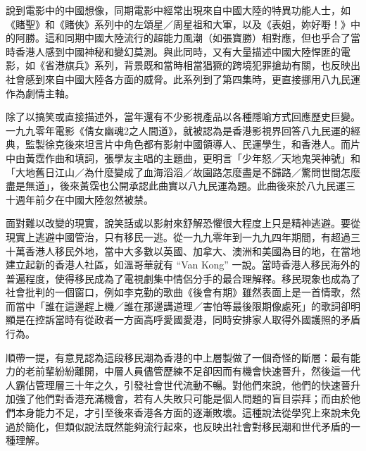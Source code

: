 說到電影中的中國想像，同期電影中經常出現來自中國大陸的特異功能人士，如《賭聖》和《賭俠》系列中的左頌星／周星祖和大軍，以及《表姐，妳好嘢！》中的阿勝。這和同期中國大陸流行的超能力風潮（如張寶勝）相對應，但也乎合了當時香港人感到中國神秘和變幻莫測。與此同時，又有大量描述中國大陸悍匪的電影，如《省港旗兵》系列，背景既和當時相當猖獗的跨境犯罪搶劫有關，也反映出社會感到來自中國大陸各方面的威脅。此系列到了第四集時，更直接挪用八九民運作為劇情主軸。

除了以搞笑或直接描述外，當年還有不少影視產品以各種隱喻方式回應歷史巨變。一九九零年電影《倩女幽魂2之人間道》，就被認為是香港影視界回答八九民運的經典，監製徐克後來坦言片中角色都有影射中國領導人、民運學生，和香港人。而片中由黃霑作曲和填詞，張學友主唱的主題曲，更明言「少年怒／天地鬼哭神號」和「大地舊日江山／為什麼變成了血海滔滔／故園路怎麼盡是不歸路／驚問世間怎麼盡是無道」，後來黃霑也公開承認此曲實以八九民運為題。此曲後來於八九民運三十週年前夕在中國大陸忽然被禁。

面對難以改變的現實，說笑話或以影射來舒解恐懼很大程度上只是精神逃避。要從現實上逃避中國管治，只有移民一逃。從一九九零年到一九九四年期間，有超過三十萬香港人移民外地，當中大多數以英國、加拿大、澳洲和美國為目的地，在當地建立起新的香港人社區，如溫哥華就有 “Van Kong” 一說。當時香港人移民海外的普遍程度，使得移民成為了電視劇集中情侶分手的最合理解釋。移民現象也成為了社會批判的一個窗口，例如李克勤的歌曲《後會有期》雖然表面上是一首情歌，然而當中「誰在這邊趕上機／誰在那邊講道理／害怕等最後限期像處死」的歌詞卻明顯是在控訴當時有從政者一方面高呼愛國愛港，同時安排家人取得外國護照的矛盾行為。


順帶一提，有意見認為這段移民潮為香港的中上層製做了一個奇怪的斷層：最有能力的老前輩紛紛離開，中層人員儘管歷練不足卻因而有機會快速晉升，然後這一代人霸佔管理層三十年之久，引發社會世代流動不暢。對他們來說，他們的快速晉升加強了他們對香港充滿機會，若有人失敗只可能是個人問題的盲目崇拜；而由於他們本身能力不足，才引至後來香港各方面的逐漸敗壞。這種說法從學究上來說未免過於簡化，但類似說法既然能夠流行起來，也反映出社會對移民潮和世代矛盾的一種理解。

